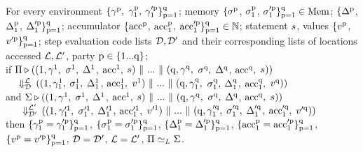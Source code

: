 \begin{theorem}%
\label{thm: NI app}
For every environment $\{\gamma^{\mathrm{{p}}}_{},$ $\gamma^{\mathrm{{p}}}_{1},$ $\gamma'^{\mathrm{{p}}}_{1}\}^{\mathrm{{q}}}_{\mathrm{{p}} = \mathrm{{1}}}$; 
memory $\{\sigma^{\mathrm{{p}}}_{}$, $\sigma^{\mathrm{{p}}}_{1}$, $\sigma'^{\mathrm{{p}}}_{1} \}^{\mathrm{{q}}}_{\mathrm{{p}} = \mathrm{{1}}}\in\mathrm{Mem}$; 
\changeMap $\{\Delta^{\mathrm{{p}}}_{}$, $\Delta^{\mathrm{{p}}}_{1}$, $\Delta'^{\mathrm{{p}}}_{1}\}^{\mathrm{{q}}}_{\mathrm{{p}} = \mathrm{{1}}}$;
accumulator $\{\mathrm{acc}^{\mathrm{{p}}}_{}$, $\mathrm{acc}^{\mathrm{{p}}}_{1}$, $\mathrm{acc}'^{\mathrm{{p}}}_{1}\}^{\mathrm{{q}}}_{\mathrm{{p}} = \mathrm{{1}}}\in\mathbb{N}$; 
statement $s$, values $\{v^{\mathrm{{p}}}_{}$, $v'^{\mathrm{{p}}}_{}\}^{\mathrm{{q}}}_{\mathrm{{p}} = \mathrm{{1}}}$; 
step evaluation code lists $\mathcal{D},\mathcal{D}'$ and their corresponding lists of locations accessed $\mathcal{L},\mathcal{L}'$, 
party $\mathrm{{p}} \in \{\mathrm{{1}}...\mathrm{{q}}\}$; 
\\
if 
$\Pi \triangleright ((\mathrm{{1}}, \gamma^{\mathrm{{1}}}_{},$ $\sigma^{\mathrm{{1}}}_{},$ $\Delta^{\mathrm{{1}}}_{}$, $\mathrm{acc}^{\mathrm{{1}}}_{},$ $s)\-\ \Vert\  ...\-\ \Vert\  (\mathrm{{q}}, \gamma^{\mathrm{{q}}}_{},$ $\sigma^{\mathrm{{q}}}_{},$ $\Delta^{\mathrm{{q}}}_{}$, $\mathrm{acc}^{\mathrm{{q}}}_{},$ $s))$ 
\\ $\-\ \quad\Downarrow^{\mathcal{L}}_\mathit{\mathcal{D}}$ $((\mathrm{{1}}, \gamma^{\mathrm{{1}}}_{1},$ $\sigma^{\mathrm{{1}}}_{1},$ $\Delta^{\mathrm{{1}}}_{1}$, $\mathrm{acc}^{\mathrm{{1}}}_{1},$ $v^{\mathrm{{1}}}_{})\-\ \Vert\  ...\-\ \Vert\  (\mathrm{{q}}, \gamma^{\mathrm{{q}}}_{1},$ $\sigma^{\mathrm{{q}}}_{1},$ $\Delta^{\mathrm{{q}}}_{1}$, $\mathrm{acc}^{\mathrm{{q}}}_{1},$ $v^{\mathrm{{q}}}_{}))$ 
\\ and   
$\Sigma \triangleright ((\mathrm{{1}}, \gamma^{\mathrm{{1}}}_{},$ $\sigma^{\mathrm{{1}}}_{},$ $\Delta^{\mathrm{{1}}}_{}$, $\mathrm{acc}^{\mathrm{{1}}}_{},$ $s)\-\ \Vert\  ...\-\ \Vert\  (\mathrm{{q}}, \gamma^{\mathrm{{q}}}_{},$ $\sigma^{\mathrm{{q}}}_{},$ $\Delta^{\mathrm{{q}}}_{}$, $\mathrm{acc}^{\mathrm{{q}}}_{},$ $s))$ 
\\ $\-\ \quad \-\ \Deval{\locLL'}{\codeLL'}$ $((\mathrm{{1}}, \gamma'^{\mathrm{{1}}}_{1},$ $\sigma'^{\mathrm{{1}}}_{1},$ $\Delta'^{\mathrm{{1}}}_{1}$, $\mathrm{acc}'^{\mathrm{{1}}}_{1},$ $v'^{\mathrm{{1}}}_{})\-\ \Vert\  ...\-\ \Vert\  (\mathrm{{q}}, \gamma'^{\mathrm{{q}}}_{1},$ $\sigma'^{\mathrm{{q}}}_{1},$ $\Delta'^{\mathrm{{q}}}_{1}$, $\mathrm{acc}'^{\mathrm{{q}}}_{1},$ $v'^{\mathrm{{q}}}_{}))$
\\ then $\{\gamma^{\mathrm{{p}}}_{1}=\gamma'^{\mathrm{{p}}}_{1}\}^{\mathrm{{q}}}_{\mathrm{{p}} = \mathrm{{1}}}$, 
$\{\sigma^{\mathrm{{p}}}_{1}=\sigma'^{\mathrm{{p}}}_{1}\}^{\mathrm{{q}}}_{\mathrm{{p}} = \mathrm{{1}}}$, 
$\{\Delta^{\mathrm{{p}}}_{1} =\Delta'^{\mathrm{{p}}}_{1}\}^{\mathrm{{q}}}_{\mathrm{{p}} = \mathrm{{1}}}$, 
$\{\mathrm{acc}^{\mathrm{{p}}}_{1}=\mathrm{acc}'^{\mathrm{{p}}}_{1}\}^{\mathrm{{q}}}_{\mathrm{{p}} = \mathrm{{1}}}$, 
$\{v^{\mathrm{{p}}}_{}=v'^{\mathrm{{p}}}_{}\}^{\mathrm{{q}}}_{\mathrm{{p}} = \mathrm{{1}}}$, 
$\mathcal{D}=\mathcal{D}'$, 
$\mathcal{L} = \mathcal{L}'$, 
$\Pi \simeq_L \Sigma$.
~\\
\end{theorem} 


